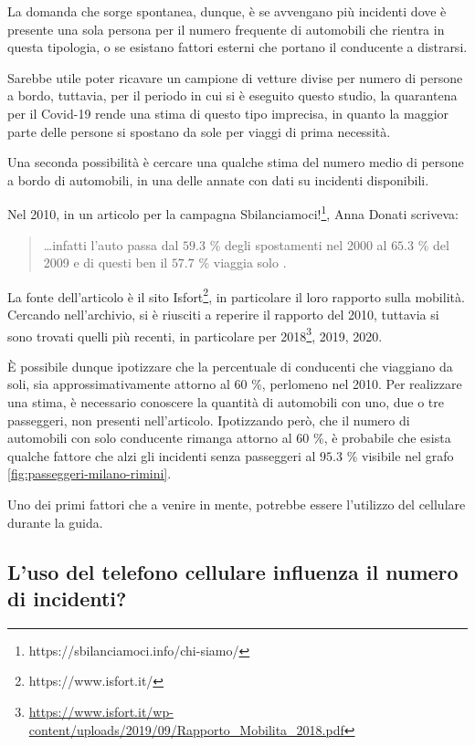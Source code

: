 \documentclass[a4paper,12pt]{report}
\begin{document}
La domanda che sorge spontanea, dunque, è se avvengano più incidenti dove è presente 
una sola persona per il numero frequente di automobili che rientra in questa tipologia, 
o se esistano fattori esterni che portano il conducente a distrarsi. 

Sarebbe utile poter ricavare un campione di vetture divise per 
numero di persone a bordo, tuttavia, per il periodo in cui si è eseguito questo 
studio, la quarantena per il Covid-19 rende una stima di questo tipo 
imprecisa, in quanto la maggior parte delle persone si spostano da sole 
per viaggi di prima necessità. 

Una seconda possibilità è cercare una qualche stima del numero medio di 
persone a bordo di automobili, in una delle annate con dati su incidenti disponibili. 

Nel 2010, in un articolo per la campagna 
Sbilanciamoci!\footnote{https://sbilanciamoci.info/chi-siamo/}, 
Anna Donati scriveva: 

\begin{quotation}
    \dots infatti l’auto passa dal $59.3$ \% degli spostamenti nel 2000 al $65.3$ \% del 
    2009 e di questi ben il $57.7$ \% viaggia solo \cite{SBILANCIAMOCI:1}. 
\end{quotation}

La fonte dell'articolo è il sito Isfort\footnote{https://www.isfort.it/}, 
in particolare il loro rapporto sulla mobilità. 
Cercando nell'archivio, si è riusciti a reperire il rapporto del 2010, 
tuttavia si sono trovati quelli più recenti, in particolare per 
2018\footnote{\url{https://www.isfort.it/wp-content/uploads/2019/09/Rapporto_Mobilita_2018.pdf}}, 
2019, 2020. 

\`E possibile dunque ipotizzare che la percentuale di conducenti che viaggiano 
da soli, sia approssimativamente attorno al $60$ \%, perlomeno nel 2010. 
Per realizzare una stima, è necessario conoscere la quantità di automobili con uno, 
due o tre passeggeri, non presenti nell'articolo. 
Ipotizzando però, che il numero di automobili con solo conducente rimanga attorno al 
$60$ \%, è probabile che esista qualche fattore che alzi gli incidenti senza passeggeri al 
$95.3$ \% visibile nel grafo \ref{fig:passeggeri-milano-rimini}. 

Uno dei primi fattori che a venire in mente, potrebbe 
essere l'utilizzo del cellulare durante la guida. 

\subsection{L'uso del telefono cellulare influenza il numero di incidenti?}
\end{document}
